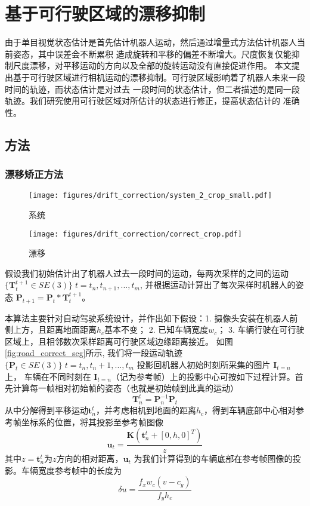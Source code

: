 \chapter{基于可行驶区域的漂移抑制}
由于单目视觉状态估计是首先估计机器人运动，然后通过增量式方法估计机器人当前姿态，其中误差会不断累积
造成旋转和平移的偏差不断增大。尺度恢复仅能抑制尺度漂移，对平移运动的方向以及全部的旋转运动没有直接促进作用。
本文提出基于可行驶区域进行相机运动的漂移抑制。可行驶区域影响着了机器人未来一段时间的轨迹，而状态估计是对过去
一段时间的状态估计，但二者描述的是同一段轨迹。我们研究使用可行驶区域对所估计的状态进行修正，提高状态估计的
准确性。

\section{方法}
\subsection{漂移矫正方法}
\label{sec:ego-correction}

\begin{figure}[t]
    \centering
    \texttt{[image: figures/drift\_correction/system\_2\_crop\_small.pdf]}
    \caption{系统}
    \label{fig:system}
  \end{figure}
\begin{figure}[t]
  \centering
  \texttt{[image: figures/drift\_correction/correct\_crop.pdf]}
  \caption{漂移}
  \label{fig:correction}
\end{figure}


假设我们初始估计出了机器人过去一段时间的运动，每两次采样的之间的运动$ \{\mathbf{T}_{t}^{t+1} \in SE(3)\}\; t =
t_n, t_{n+1}, ...,t_m$, 并根据运动计算出了每次采样时机器人的姿态
$\mathbf{P}_{t+1} =\mathbf{P}_{t}*\mathbf{T}_{t}^{t+1}$。

本算法主要针对自动驾驶系统设计，并作出如下假设：1. 摄像头安装在机器人前侧上方，且距离地面距离$h_c$基本不变； 2. 已知车辆宽度$w_c$；
3. 车辆行驶在可行驶区域上，且相邻数次采样距离可行驶区域边缘距离接近。
如图 \ref{fig:road_correct_seg}所示, 我们将一段运动轨迹
$ \{\mathbf{P}_{t} \in SE(3)\} \;t = t_n, t_{n}+1, ...,t_m$ 投影回机器人初始时刻所采集的图片 $\mathbf{I}_{t=n}$ 上，
车辆在不同时刻在 $\mathbf{I}_{t=n}$（记为参考帧）上的投影中心可按如下过程计算。首先计算每一帧相对初始帧的姿态（也就是初始帧到此真的运动）
\begin{equation}
    \mathbf{T}_n^{t} = \mathbf{P}_{n}^{-1}\mathbf{P}_{t}
\end{equation}
从中分解得到平移运动$\mathbf{t}_n^t$，并考虑相机到地面的距离$h_c$，得到车辆底部中心相对参考帧坐标系的位置，将其投影至参考帧图像
\begin{equation}
    \mathbf{u}_{t} = \frac{\mathbf{K}\left(\mathbf{t}_n^t + [0,h,0]^{T}\right)}{z}
    \label{eq:projection}
\end{equation}
其中$z=\mathbf{t}_n^t$为$z$方向的相对距离，$\mathbf{u}_t$ 为我们计算得到的车辆底部在参考帧图像的投影。车辆宽度参考帧中的长度为
\begin{equation}
    \delta u =\frac{f_x w_c\left(v-c_y\right)}{f_y h_c}
\end{equation}

